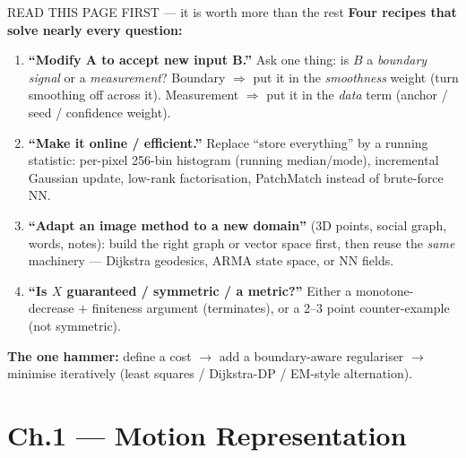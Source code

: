 \documentclass[9pt,a4paper]{extarticle}
\begin{document}
\begin{keybox}{READ THIS PAGE FIRST --- it is worth more than the rest}
\smallskip
\textbf{Four recipes that solve nearly every question:}
\begin{enumerate}
  \item \textbf{``Modify A to accept new input B.''} Ask one thing: is $B$ a \emph{boundary signal} or a \emph{measurement}? Boundary $\Rightarrow$ put it in the \emph{smoothness} weight (turn smoothing off across it). Measurement $\Rightarrow$ put it in the \emph{data} term (anchor / seed / confidence weight).
  \item \textbf{``Make it online / efficient.''} Replace ``store everything'' by a running statistic: per-pixel 256-bin histogram (running median/mode), incremental Gaussian update, low-rank factorisation, PatchMatch instead of brute-force NN.
  \item \textbf{``Adapt an image method to a new domain''} (3D points, social graph, words, notes): build the right graph or vector space first, then reuse the \emph{same} machinery --- Dijkstra geodesics, ARMA state space, or NN fields.
  \item \textbf{``Is $X$ guaranteed / symmetric / a metric?''} Either a monotone-decrease $+$ finiteness argument (terminates), or a 2--3 point counter-example (not symmetric).
\end{enumerate}

\textbf{The one hammer:} define a cost $\rightarrow$ add a boundary-aware regulariser $\rightarrow$ minimise iteratively (least squares / Dijkstra-DP / EM-style alternation).
\end{keybox}

\section{Ch.1 --- Motion Representation}
\end{document}
